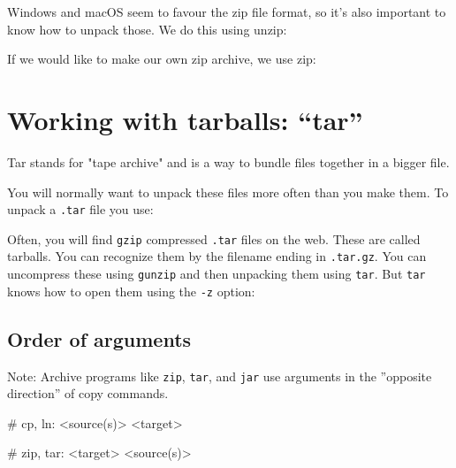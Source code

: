 Windows and macOS seem to favour the zip file format, so it's also important to
know how to unpack those. We do this using unzip:

\begin{prompt}
\end{prompt}

If we would like to make our own zip archive, we use zip:

\begin{prompt}
\end{prompt}

\section{Working with tarballs: ``tar''}

Tar stands for "tape archive" and is a way to bundle files together in a bigger
file.

You will normally want to unpack these files more often than you make them. To
unpack a \lstinline|.tar| file you use:

\begin{prompt}
\end{prompt}

Often, you will find \lstinline|gzip| compressed \lstinline|.tar| files on the web. These are called
tarballs. You can recognize them by the filename ending in \lstinline|.tar.gz|.
 You can uncompress these using \lstinline|gunzip| and then unpacking them using
\lstinline|tar|. But \lstinline|tar| knows how to open them using the \lstinline|-z| option:

\begin{prompt}
\end{prompt}

\subsection{Order of arguments}

Note: Archive programs like \lstinline|zip|, \lstinline|tar|, and \lstinline|jar| use arguments in the
''opposite direction'' of copy commands.

\begin{prompt}
    # cp, ln: <source(s)> <target>

    # zip, tar: <target> <source(s)>
\end{prompt}


